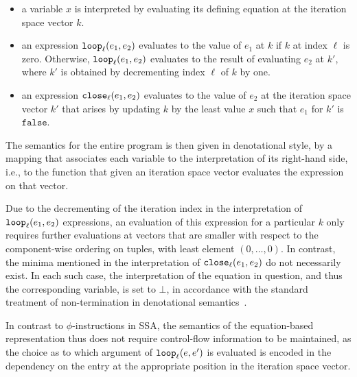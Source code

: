 {\begin{itemize}
\item a variable $x$ is interpreted by evaluating its defining
equation at the iteration space vector $k$.

\item an expression $\mathtt{loop}_{{\ell}}({e_1},{e_2})$ evaluates to the value of
$e_1$ at $k$ if $k$ at index $\ell$ is zero. Otherwise, $\mathtt{loop}_{{\ell}}({e_1},{e_2})$ evaluates to the result of evaluating $e_2$ at $k'$,
where $k'$ is obtained by decrementing index $\ell$ of $k$ by one.

\item an expression $\mathtt{close}_{{\ell}}({e_1},{e_2})$ evaluates to the value
of $e_2$ at the iteration space vector $k'$ that arises by updating
$k$ by the least value $x$ such that $e_1$ for $k'$ is
$\mathtt{false}$.

\end{itemize}

The semantics for the entire program is then given in denotational
style, by a mapping that associates each variable to the
interpretation of its right-hand side, i.e., to the function that given
an iteration space vector evaluates the expression on that vector.

Due to the decrementing of the iteration index in the interpretation
of $\mathtt{loop}_{{\ell}}({e_1},{e_2})$ expressions, an evaluation of this
expression for a particular $k$ only requires further evaluations at
vectors that are smaller with respect to the component-wise ordering
on tuples, with least element $(0,\ldots,0)$. In contrast, the minima
mentioned in the interpretation of $\mathtt{close}_{{\ell}}({e_1},{e_2})$ do not necessarily exist. In each such case, the interpretation
of the equation in question, and thus the corresponding variable, is
set to $\bot$, in accordance with the standard treatment of
non-termination in denotational semantics~\cite{winskel_93_formal}.

In contrast to $\phi$-instructions in SSA, the semantics of the
equation-based representation thus does not require control-flow
information to be maintained, as the choice as to which argument of
$\mathtt{loop}_{{\ell}}({e},{e'})$ is evaluated is encoded in the dependency on
the entry at the appropriate position in the iteration space vector.

}
